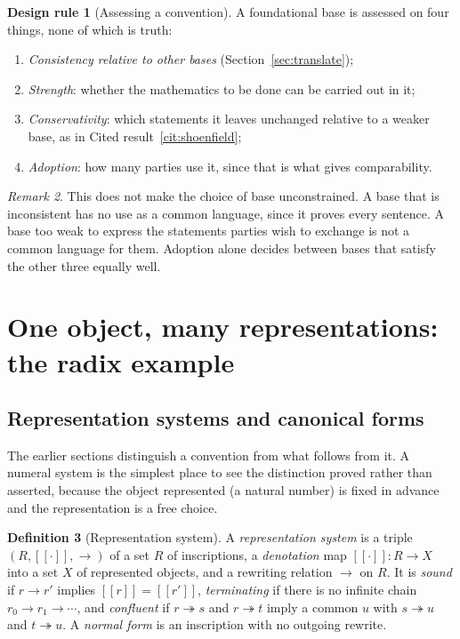 \documentclass[11pt]{article}
\newcommand{\sem}[1]{[\![#1]\!]}
\theoremstyle{definition}
\newtheorem{definition}{Definition}[section]
\newtheorem{designrule}[definition]{Design rule}
\theoremstyle{plain}
\theoremstyle{remark}
\newtheorem{remark}[definition]{Remark}
\begin{document}
\begin{designrule}[Assessing a convention]\label{dr:assess}
A foundational base is assessed on four things, none of which is truth:
\begin{enumerate}[label=(\roman*)]
\item \emph{Consistency relative to other bases} (Section~\ref{sec:translate});
\item \emph{Strength}: whether the mathematics to be done can be carried out in it;
\item \emph{Conservativity}: which statements it leaves unchanged relative to a weaker base, as in Cited result~\ref{cit:shoenfield};
\item \emph{Adoption}: how many parties use it, since that is what gives comparability.
\end{enumerate}
\end{designrule}

\begin{remark}
This does not make the choice of base unconstrained. A base that is inconsistent has no use as a common language, since it proves every sentence. A base too weak to express the statements parties wish to exchange is not a common language for them. Adoption alone decides between bases that satisfy the other three equally well.
\end{remark}

\section{One object, many representations: the radix example}\label{sec:radix}

\subsection{Representation systems and canonical forms}

The earlier sections distinguish a convention from what follows from it. A numeral system is the simplest place to see the distinction proved rather than asserted, because the object represented (a natural number) is fixed in advance and the representation is a free choice.

\begin{definition}[Representation system]\label{def:repsys}
A \emph{representation system} is a triple $(R,\sem{\cdot},\to)$ of a set $R$ of inscriptions, a \emph{denotation} map $\sem{\cdot}:R\to X$ into a set $X$ of represented objects, and a rewriting relation $\to$ on $R$. It is \emph{sound} if $r\to r'$ implies $\sem r=\sem{r'}$, \emph{terminating} if there is no infinite chain $r_0\to r_1\to\cdots$, and \emph{confluent} if $r\twoheadrightarrow s$ and $r\twoheadrightarrow t$ imply a common $u$ with $s\twoheadrightarrow u$ and $t\twoheadrightarrow u$. A \emph{normal form} is an inscription with no outgoing rewrite.
\end{definition}
\end{document}
